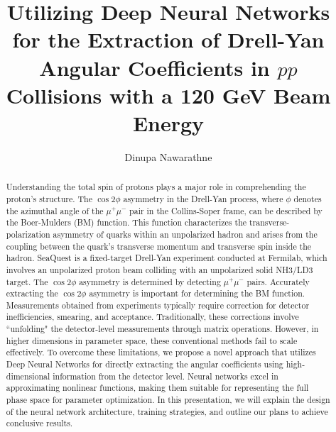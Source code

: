 \documentclass{article}
\title{Utilizing Deep Neural Networks for the Extraction of Drell-Yan Angular Coefficients in $pp$ Collisions with a 120 GeV Beam Energy}
\author{Dinupa Nawarathne}
\begin{document}
\maketitle

\begin{abstract}
Understanding the total spin of protons plays a major role in comprehending the proton's structure. The $\cos2\phi$ asymmetry
in the Drell-Yan process, where $\phi$ denotes the azimuthal angle of the $\mu^{+}\mu^{-}$ pair in the Collins-Soper
frame, can be described by the Boer-Mulders (BM) function. This function characterizes the transverse-polarization asymmetry
of quarks within an unpolarized hadron and arises from the coupling between the quark's transverse momentum and transverse
spin inside the hadron. SeaQuest is a fixed-target Drell-Yan experiment conducted at Fermilab, which involves an unpolarized
proton beam colliding with an unpolarized solid NH3/LD3 target. The $\cos2\phi$ asymmetry is determined by detecting $\mu^{+}\mu^{-}$
pairs. Accurately extracting the $\cos2\phi$ asymmetry is important for determining the BM function. Measurements obtained
from experiments typically require correction for detector inefficiencies, smearing, and acceptance. Traditionally, these
corrections involve ``unfolding" the detector-level measurements through matrix operations. However, in higher dimensions
in parameter space, these conventional methods fail to scale effectively. To overcome these limitations, we propose a
novel approach that utilizes Deep Neural Networks for directly extracting the angular coefficients using high-dimensional
information from the detector level. Neural networks excel in approximating nonlinear functions, making them suitable for
representing the full phase space for parameter optimization. In this presentation, we will explain the design of the neural
network architecture, training strategies, and outline our plans to achieve conclusive results.
\end{abstract}
\end{document}
